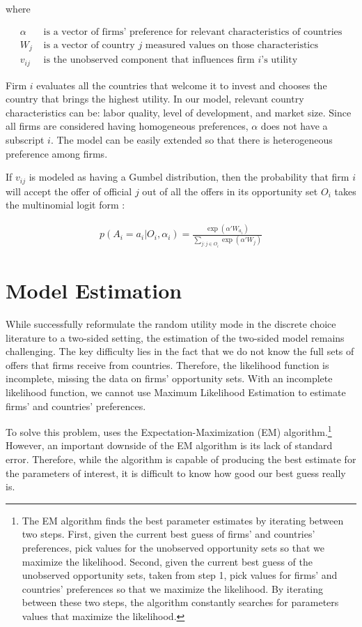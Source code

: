 where

\begin{align*}
\alpha &\text{ is a vector of firms' preference for relevant characteristics of countries} \\
W_j &\text{ is a vector of country $j$ measured values on those characteristics} \\
v_{ij} &\text{ is the unobserved component that influences firm $i$'s utility}
\end{align*}

Firm $i$ evaluates all the countries that welcome it to invest and chooses the country that brings the highest utility. In our model, relevant country characteristics can be: labor quality, level of development, and market size. Since all firms are considered having homogeneous preferences, $\alpha$ does not have a subscript $i$. The model can be easily extended so that there is heterogeneous preference among firms.

If $v_{ij}$ is modeled as having a Gumbel distribution, then the probability that firm $i$ will accept the offer of official $j$ out of all the offers in its opportunity set $O_i$ takes the multinomial logit form \citep{Cameron2005}:

\begin{align}
p(A_i = a_i | O_i, \alpha_i) = \frac{\exp(\alpha'W_{a_i})}{\sum\limits_{j:j \in O_i} \exp(\alpha'W_j)} \label{eq:conditional_probability_of_accept}
\end{align}

\section{Model Estimation}
\label{sec:tsl_estimate}

While \citet{Logan1996, Logan1998} successfully reformulate the random utility mode in the discrete choice literature to a two-sided setting, the estimation of the two-sided model remains challenging. The key difficulty lies in the fact that we do not know the full sets of offers that firms receive from countries. Therefore, the likelihood function is incomplete, missing the data on firms' opportunity sets. With an incomplete likelihood function, we cannot use Maximum Likelihood Estimation to estimate firms' and countries' preferences.

To solve this problem, \cite{Logan1996} uses the Expectation-Maximization (EM) algorithm.\footnote{The EM algorithm finds the best parameter estimates by iterating between two steps. First, given the current best guess of firms' and countries' preferences, pick values for the unobserved opportunity sets so that we maximize the likelihood. Second, given the current best guess of the unobserved opportunity sets, taken from step 1, pick values for firms' and countries' preferences so that we maximize the likelihood. By iterating between these two steps, the algorithm constantly searches for parameters values that maximize the likelihood.} However, an important downside of the EM algorithm is its lack of standard error. Therefore, while the algorithm is capable of producing the best estimate for the parameters of interest, it is difficult to know how good our best guess really is.

